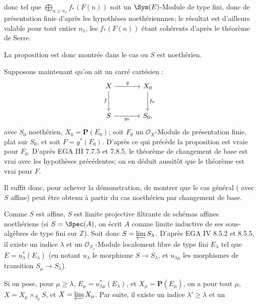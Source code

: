 donc tel que \(\bigoplus_{n\geq n_1} f_*(F(n))\) soit un \(\Sym(E)\)-Module de type fini, donc de présentation finie d'après les hypothèses noethériennnes; le résultat est d'ailleurs valable pour tout entier \(n_1\), les \(f_*(F(n))\) étant cohérents d'après le théorème de Serre.

La proposition est donc montrée dans le cas ou \(S\) est noethérien.

Supposons maintenant qu'on ait un carré cartésien :
\[
\begin{tikzcd}[column sep=large,row sep=large]
X \arrow[r,"g"] \arrow[d,"f"'] & X_0 \arrow[d,"f_0"]\\
S \arrow[r,"g_0"'] & S_0,
\end{tikzcd}
\]
avec \(S_0\) noethérien, \(X_0=\mathbf P(E_0)\); soit \(F_0\) un \(\mathcal O_X\)-Module de présentation finie, plat sur \(S_0\), et soit \(F=g^*(F_0)\). D'après ce qui précède la proposition est vraie pour \(F_0\). D'après EGA III 7.7.5 et 7.8.5, le théorème de changement de base est vrai avec les hypothèses précédentes; on en déduit aussitôt que le théorème est vrai pour \(F\).

Il suffit donc, pour achever la démonstration, de montrer que le cas général ( avec \(S\) affine) peut être obtenu à partir du cas noethérien par changement de base.

Comme \(S\) est affine, \(S\) est limite projective filtrante de schémas affines noethériens (si \(S=\Spec(A)\), on écrit \(A\) comme limite inductive de ses sous-algèbres de type fini sur \(\mathbb Z\)). Soit donc \(S=\varprojlim S_\lambda\). D'après EGA IV 8.5.2 et 8.5.5, il existe un indice \(\lambda\) et un \(\mathcal O_{S_\lambda}\)-Module localement libre de type fini \(E_\lambda\) tel que \(E=u_\lambda^*(E_\lambda)\) (en notant \(u_\lambda\) le morphisme \(S\to S_\lambda\), et \(u_{\lambda\mu}\) les morphismes de transition \(S_\mu\to S_\lambda\)).

Si on pose, pour \(\mu\geq\lambda\), \(E_\mu=u_{\lambda\mu}^*(E_\lambda)\), et \(X_\mu=\mathbf P(E_\mu)\), on a pour tout \(\mu\), \(X=X_\mu\times_{S_\mu}S\), et \(X=\varprojlim X_\mu\). Par suite, il existe un indice \(\lambda'\geq\lambda\) et un

